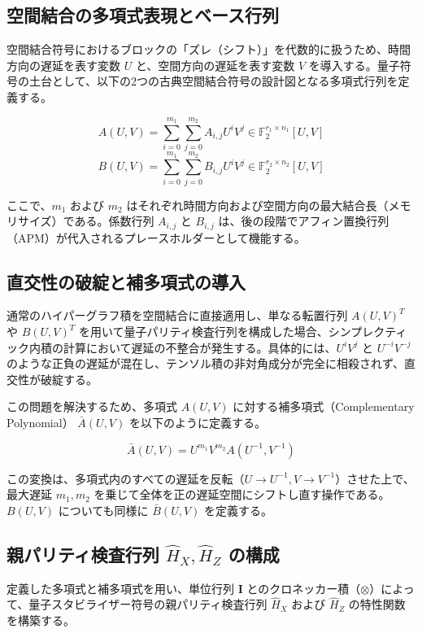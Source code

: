 \documentclass[12pt]{article}
\begin{document}
\subsection{空間結合の多項式表現とベース行列}
空間結合符号におけるブロックの「ズレ（シフト）」を代数的に扱うため、時間方向の遅延を表す変数 $U$ と、空間方向の遅延を表す変数 $V$ を導入する。量子符号の土台として、以下の2つの古典空間結合符号の設計図となる多項式行列を定義する。

\begin{equation}
    A(U,V) = \sum_{i=0}^{m_1} \sum_{j=0}^{m_2} A_{i,j} U^i V^j \in \mathbb{F}_2^{r_1 \times n_1}[U,V]
\end{equation}
\begin{equation}
    B(U,V) = \sum_{i=0}^{m_1} \sum_{j=0}^{m_2} B_{i,j} U^i V^j \in \mathbb{F}_2^{r_2 \times n_2}[U,V]
\end{equation}

ここで、$m_1$ および $m_2$ はそれぞれ時間方向および空間方向の最大結合長（メモリサイズ）である。係数行列 $A_{i,j}$ と $B_{i,j}$ は、後の段階でアフィン置換行列（APM）が代入されるプレースホルダーとして機能する。

\subsection{直交性の破綻と補多項式の導入}
通常のハイパーグラフ積を空間結合に直接適用し、単なる転置行列 $A(U,V)^T$ や $B(U,V)^T$ を用いて量子パリティ検査行列を構成した場合、シンプレクティック内積の計算において遅延の不整合が発生する。具体的には、$U^i V^j$ と $U^{-i} V^{-j}$ のような正負の遅延が混在し、テンソル積の非対角成分が完全に相殺されず、直交性が破綻する。

この問題を解決するため、多項式 $A(U,V)$ に対する補多項式（Complementary Polynomial） $\bar{A}(U,V)$ を以下のように定義する。

\begin{equation}
    \bar{A}(U,V) = U^{m_1}V^{m_2}A(U^{-1}, V^{-1})
\end{equation}

この変換は、多項式内のすべての遅延を反転（$U \to U^{-1}, V \to V^{-1}$）させた上で、最大遅延 $m_1, m_2$ を乗じて全体を正の遅延空間にシフトし直す操作である。$B(U,V)$ についても同様に $\bar{B}(U,V)$ を定義する。

\subsection{親パリティ検査行列 $\hat{H}_X, \hat{H}_Z$ の構成}
定義した多項式と補多項式を用い、単位行列 $\mathbf{I}$ とのクロネッカー積（$\otimes$）によって、量子スタビライザー符号の親パリティ検査行列 $\hat{H}_X$ および $\hat{H}_Z$ の特性関数を構築する。
\end{document}
